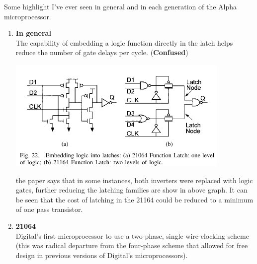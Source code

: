 \documentclass[11pt]{article}
\newcommand{\note}[1]{\scriptsize{#1}\normalsize}
\begin{document}
Some highlight I've ever seen in general and in each generation of the Alpha microprocessor.
\begin{enumerate}
	\item \textbf{In general} \\
	The capability of embedding a logic function directly in the latch helps reduce the number of gate delays per cycle. (\textbf{Confused}) 
	\begin{center}
		\includegraphics[scale=0.5]{embedding_Latch.png}
	\end{center} 
	the paper says that in some instances, both inverters were replaced with logic gates, further reducing the latching families are show in above graph. It can be seen that the cost of latching in the 21164 could be reduced to a minimum of one pass transistor.
	\item \textbf{21064} \\
	Digital's first microprocessor to use a two-phase, single wire-clocking scheme (\note{this was radical departure from the four-phase scheme that allowed for free design in previous versions of Digital's microprocessors}).
	

\end{enumerate}
\end{document}
